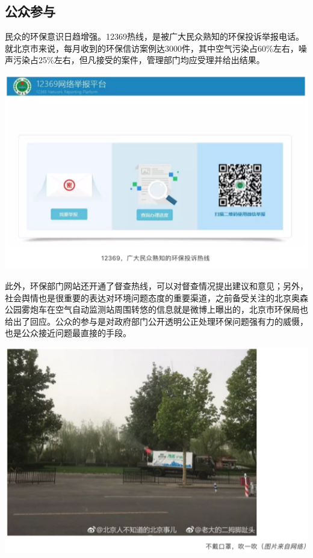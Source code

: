 \documentclass[]{book}
\begin{document}
\hypertarget{ux516cux4f17ux53c2ux4e0e}{%
\subsection{公众参与}\label{ux516cux4f17ux53c2ux4e0e}}

民众的环保意识日趋增强。12369热线，是被广大民众熟知的环保投诉举报电话。就北京市来说，每月收到的环保信访案例达3000件，其中空气污染占60\%左右，噪声污染占25\%左右，但凡接受的案件，管理部门均应受理并给出结果。

\includegraphics[width=6.67in]{images/fw5}

此外，环保部门网站还开通了督查热线，可以对督查情况提出建议和意见；另外，社会舆情也是很重要的表达对环境问题态度的重要渠道，之前备受关注的北京奥森公园雾炮车在空气自动监测站周围转悠的信息就是微博上曝出的，北京市环保局也给出了回应。公众的参与是对政府部门公开透明公正处理环保问题强有力的威慑，也是公众接近问题最直接的手段。

\includegraphics[width=6.67in]{images/fw6}
\end{document}
